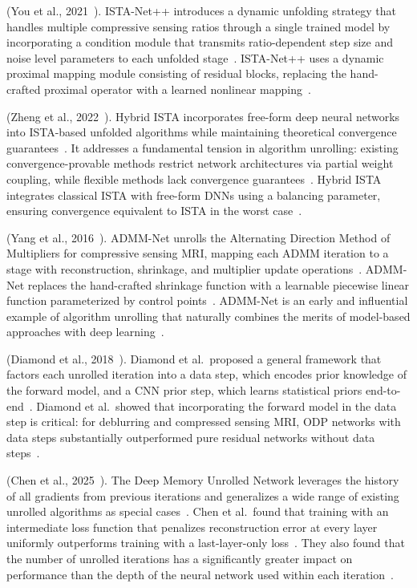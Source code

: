  (You et al., 2021~\cite{you2021istanetpp}). ISTA-Net++ introduces a dynamic unfolding strategy that handles multiple compressive sensing ratios through a single trained model by incorporating a condition module that transmits ratio-dependent step size and noise level parameters to each unfolded stage~\cite{you2021istanetpp}. ISTA-Net++ uses a dynamic proximal mapping module consisting of residual blocks, replacing the hand-crafted proximal operator with a learned nonlinear mapping~\cite{you2021istanetpp}.

 (Zheng et al., 2022~\cite{zheng2022hybridista}). Hybrid ISTA incorporates free-form deep neural networks into ISTA-based unfolded algorithms while maintaining theoretical convergence guarantees~\cite{zheng2022hybridista}. It addresses a fundamental tension in algorithm unrolling: existing convergence-provable methods restrict network architectures via partial weight coupling, while flexible methods lack convergence guarantees~\cite{zheng2022hybridista}. Hybrid ISTA integrates classical ISTA with free-form DNNs using a balancing parameter, ensuring convergence equivalent to ISTA in the worst case~\cite{zheng2022hybridista}.

 (Yang et al., 2016~\cite{yang2016admmnet}). ADMM-Net unrolls the Alternating Direction Method of Multipliers for compressive sensing MRI, mapping each ADMM iteration to a stage with reconstruction, shrinkage, and multiplier update operations~\cite{yang2016admmnet}. ADMM-Net replaces the hand-crafted shrinkage function with a learnable piecewise linear function parameterized by control points~\cite{yang2016admmnet}. ADMM-Net is an early and influential example of algorithm unrolling that naturally combines the merits of model-based approaches with deep learning~\cite{yang2016admmnet}.

 (Diamond et al., 2018~\cite{diamond2018odp}). Diamond et al.\ proposed a general framework that factors each unrolled iteration into a data step, which encodes prior knowledge of the forward model, and a CNN prior step, which learns statistical priors end-to-end~\cite{diamond2018odp}. Diamond et al.\ showed that incorporating the forward model in the data step is critical: for deblurring and compressed sensing MRI, ODP networks with data steps substantially outperformed pure residual networks without data steps~\cite{diamond2018odp}.

 (Chen et al., 2025~\cite{chen2025demun}). The Deep Memory Unrolled Network leverages the history of all gradients from previous iterations and generalizes a wide range of existing unrolled algorithms as special cases~\cite{chen2025demun}. Chen et al.\ found that training with an intermediate loss function that penalizes reconstruction error at every layer uniformly outperforms training with a last-layer-only loss~\cite{chen2025demun}. They also found that the number of unrolled iterations has a significantly greater impact on performance than the depth of the neural network used within each iteration~\cite{chen2025demun}.


